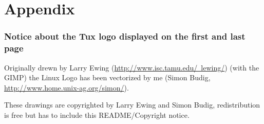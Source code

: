 \documentclass[pdftex,a4paper,titlepage,11pt]{article}
\newcommand{\lastPage}{
	\newpage
	\strut
	\fancyhf{}
	\renewcommand{\headrulewidth}{0pt}
	\addtocounter{page}{-1}
	\AddToShipoutPicture*{\BackgroundPic{Tux_n&b_half_1.png}}
	\newpage
}
\newcommand\BackgroundPic[1]{
	\put(0,-100){
		\parbox[b][\paperheight]{\paperwidth}{
			\vfill
			\centering
			\texttt{[image: \#1]}
			\vfill
		}
	}
}
\begin{document}
\newpage



\printnomenclature[3cm]

\newpage

\section*{Appendix} 

\subsubsection*{Notice about the Tux logo displayed on the first and last page}
Originally drewn by Larry Ewing (\href{http://www.isc.tamu.edu/~lewing/}{http://www.isc.tamu.edu/~lewing/}) (with the GIMP) the Linux Logo has been vectorized by me (Simon Budig, \href{http://www.home.unix-ag.org/simon/}{http://www.home.unix-ag.org/simon/}).

These drawings are copyrighted by Larry Ewing and Simon Budig, redistribution is free but has to include this README/Copyright notice.

\lastPage
\end{document}
